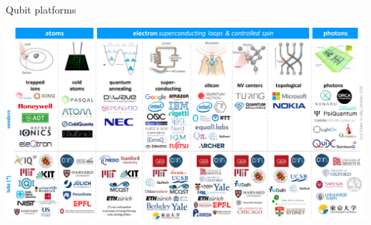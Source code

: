\documentclass[aspectratio=169,10pt]{beamer}
\begin{document}
\begin{frame}{Qubit platforms}
  \begin{center}
      \includegraphics[height=0.8\textheight]{figures/platforms.png}
  \end{center}
\end{frame}
\end{document}
